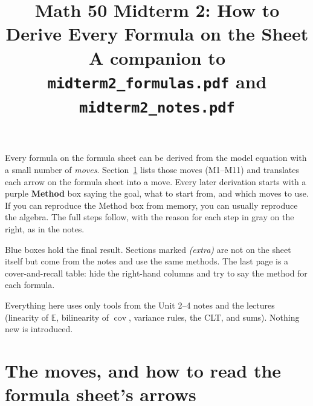 \documentclass[11pt]{article}
\title{\textbf{Math 50 Midterm 2: How to Derive Every Formula on the Sheet}\\[2pt]
\large A companion to \texttt{midterm2\_formulas.pdf} and \texttt{midterm2\_notes.pdf}}
\author{}
\date{}
\newcommand{\E}{\mathbb{E}}
\newcommand{\Cov}{\operatorname{cov}}
\begin{document}
\maketitle
\thispagestyle{fancy}

\begin{tipbox}[title={How to use this document}]
Every formula on the formula sheet can be derived from the model equation with a small number of \emph{moves}. Section~\ref{sec:moves}
lists those moves (M1--M11) and translates each arrow on the formula sheet into a move. Every later derivation starts with a purple
\textbf{Method} box saying the goal, what to start from, and which moves to use. If you can reproduce the Method box from memory, you can
usually reproduce the algebra. The full steps follow, with the reason for each step in gray on the right, as in the notes.

Blue boxes hold the final result. Sections marked \emph{(extra)} are not on the sheet itself but come from the notes and use the same
methods. The last page is a cover-and-recall table: hide the right-hand columns and try to say the method for each formula.

Everything here uses only tools from the Unit 2--4 notes and the lectures (linearity of $\E$, bilinearity of $\Cov$, variance rules, the CLT,
and sums). Nothing new is introduced.
\end{tipbox}

\tableofcontents

\clearpage
\section{The moves, and how to read the formula sheet's arrows}\label{sec:moves}
\end{document}
